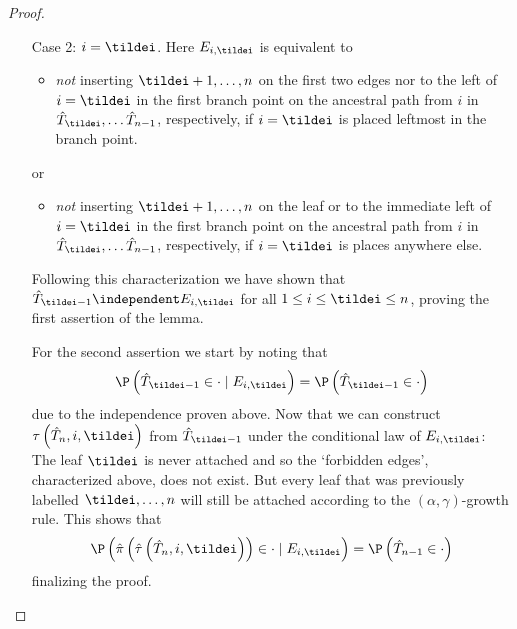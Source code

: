 \begin{proof}
\begin{itemize}
          \item[Case 2: $i = \tildei$.] Here $E_{i, \tildei}$ is equivalent to
            \begin{itemize}
              \item \textit{not} inserting $\tildei + 1, \ldots, n$ on the first two edges nor to the left of $i = \tildei$ in the first branch point on the ancestral path from $i$ in $\hat{T}_{\tildei}, \ldots \hat{T}_{n-1}$, respectively, if $i = \tildei$ is placed leftmost in the branch point.
            \end{itemize}
            or
            \begin{itemize}
              \item \textit{not} inserting $\tildei + 1, \ldots, n$ on the leaf or to the immediate left of $i = \tildei$ in the first branch point on the ancestral path from $i$ in $\hat{T}_{\tildei}, \ldots \hat{T}_{n-1}$, respectively, if $i = \tildei$ is places anywhere else.
            \end{itemize}
            Following this characterization we have shown that $\hat{T}_{\tildei - 1} \independent E_{i, \tildei}$ for all $1 \leq i \leq \tildei \leq n$, proving the first assertion of the lemma.
            
            For the second assertion we start by noting that
            \begin{align}\label{ImpLemmaStartPoint}
              \P \left( \hat{T}_{\tildei - 1} \in \cdot \mid E_{i,\tildei} \right) = \P \left( \hat{T}_{\tildei - 1} \in \cdot \right)
            \end{align}
            due to the independence proven above.
            Now that we can construct $\tau \left( \hat{T}_n, i, \tildei \right)$ from $\hat{T}_{\tildei - 1}$ under the conditional law of $E_{i, \tildei}$:
            The leaf $\tildei$ is never attached and so the `forbidden edges', characterized above, does not exist.
            But every leaf that was previously labelled $\tildei, \ldots, n$ will still be attached according to the $(\alpha, \gamma)$-growth rule.
            This shows that
            \begin{align}\label{ImpLemmaEnd}
              \P \left( \hat{\pi} \left( \hat{\tau} \left( \hat{T}_n, i, \tildei \right) \right) \in \cdot \mid E_{i, \tildei} \right)
              = \P \left( \hat{T}_{n-1} \in \cdot \right)
            \end{align}
            finalizing the proof.
    \end{itemize}
\end{proof}
